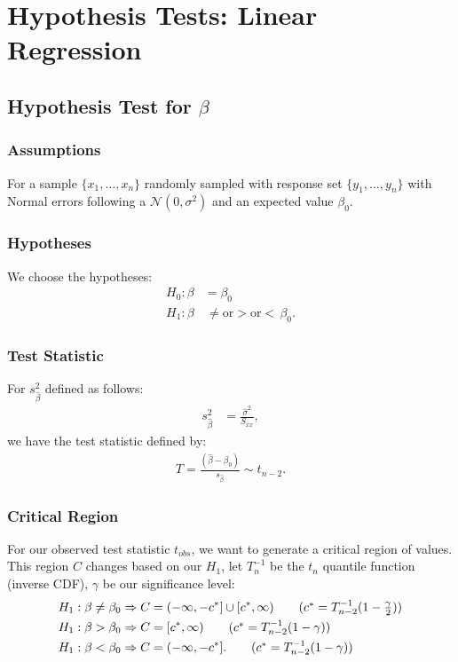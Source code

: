 \documentclass[a4paper, 12pt, twoside]{article}
\begin{document}
\section{Hypothesis Tests: Linear Regression}

\subsection{Hypothesis Test for $\beta$}

\subsubsection{Assumptions}

For a sample $\{x_1, \ldots, x_n\}$ randomly sampled with response
set $\{y_1, \ldots, y_n\}$ with Normal errors following a
$\mathcal{N}(0, \sigma^2)$ and an expected value $\beta_0$.

\subsubsection{Hypotheses}

We choose the hypotheses:
\begin{align*}
    H_0 : \beta & = \beta_0                                   \\
    H_1 : \beta & \, \neq \text{or} > \text{or} < \, \beta_0.
\end{align*}

\subsubsection{Test Statistic}

For $s_{\hat\beta}^2$ defined as follows:
\begin{align*}
    s_{\hat\beta}^2 & = \frac{\hat\sigma^2}{S_{xx}},
\end{align*}
we have the test statistic defined by:
\begin{align*}
    T = \frac{(\hat\beta - \beta_0)}{s_{\hat\beta}}
    \sim t_{n - 2}.
\end{align*}

\subsubsection{Critical Region}

For our observed test statistic $t_{obs}$, we want to generate a
critical region of values. This region $C$ changes based on our
$H_1$, let $T^{-1}_n$ be the $t_n$ quantile function
(inverse CDF), $\gamma$ be our significance level:
\begin{align*}
    H_1 : \beta \neq \beta_0 & \Rightarrow
    C = (-\infty, -c^*] \cup [c^*, \infty)
    \tag{$ c^* = T_{n-2}^{-1}(1 - \frac{\gamma}{2}) $} \\
    H_1 : \beta > \beta_0    & \Rightarrow
    C = [c^*, \infty)
    \tag{$ c^* = T_{n-2}^{-1}(1 - \gamma) $}           \\
    H_1 : \beta < \beta_0    & \Rightarrow
    C = (-\infty, -c^*].
    \tag{$ c^* = T_{n-2}^{-1}(1 - \gamma) $}
\end{align*}
\end{document}
